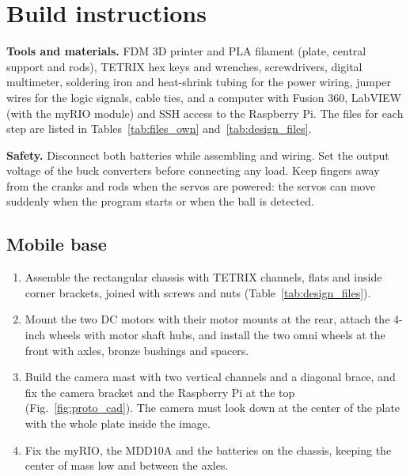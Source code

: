 \documentclass[11pt,letterpaper]{article}
\begin{document}


\section{Build instructions}

\textbf{Tools and materials.} FDM 3D printer and PLA filament (plate,
central support and rods), TETRIX hex keys and wrenches, screwdrivers,
digital multimeter, soldering iron and heat-shrink tubing for the power
wiring, jumper wires for the logic signals, cable ties, and a computer
with Fusion 360, LabVIEW (with the myRIO module) and SSH access to the
Raspberry Pi. The files for each step are listed in
Tables~\ref{tab:files_own} and~\ref{tab:design_files}.

\textbf{Safety.} Disconnect both batteries while assembling and wiring.
Set the output voltage of the buck converters before connecting any
load. Keep fingers away from the cranks and rods when the servos are
powered: the servos can move suddenly when the program starts or when
the ball is detected.

\subsection{Mobile base}
\begin{enumerate}
    \item Assemble the rectangular chassis with TETRIX channels, flats and
    inside corner brackets, joined with screws and nuts
    (Table~\ref{tab:design_files}).
    \item Mount the two DC motors with their motor mounts at the rear,
    attach the 4-inch wheels with motor shaft hubs, and install the two
    omni wheels at the front with axles, bronze bushings and spacers.
    \item Build the camera mast with two vertical channels and a diagonal
    brace, and fix the camera bracket and the Raspberry Pi at the top
    (Fig.~\ref{fig:proto_cad}). The camera must look down at the center
    of the plate with the whole plate inside the image.
    \item Fix the myRIO, the MDD10A and the batteries on the chassis,
    keeping the center of mass low and between the axles.
\end{enumerate}
\end{document}
